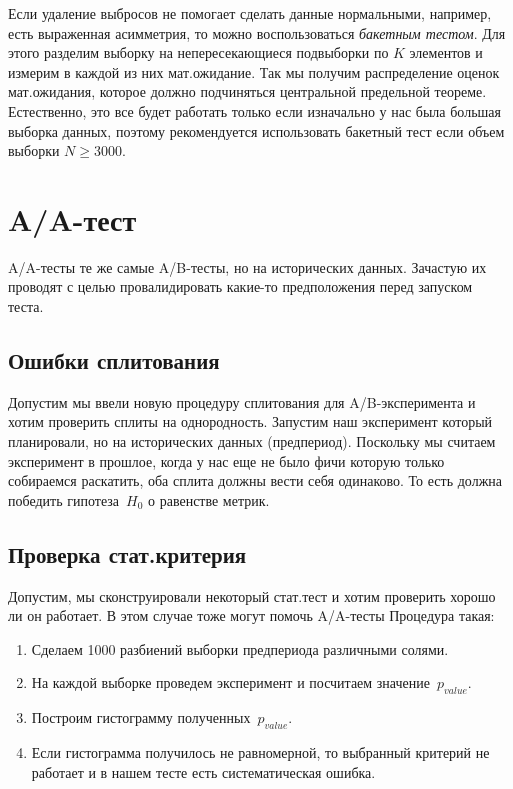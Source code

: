 \documentclass[../handbook.tex]{subfiles}
\begin{document}
Если удаление выбросов не помогает сделать данные нормальными, например, есть выраженная асимметрия, то можно воспользоваться \emph{бакетным тестом}. Для этого разделим выборку на непересекающиеся подвыборки по $K$ элементов и измерим в каждой из них мат.ожидание. Так мы получим распределение оценок мат.ожидания, которое должно подчиняться центральной предельной теореме. Естественно, это все будет работать только если изначально у нас была большая выборка данных, поэтому рекомендуется использовать бакетный тест если объем выборки $N \geq 3000$.


\section{A\slash A-тест}
A\slash A-тесты те же самые A\slash B-тесты, но на исторических данных. Зачастую их проводят с целью провалидировать какие-то предположения перед запуском теста.

\subsection{Ошибки сплитования}

Допустим мы ввели новую процедуру сплитования для A/B-эксперимента и хотим проверить сплиты на однородность. Запустим наш эксперимент который планировали, но на исторических данных (предпериод). Поскольку мы считаем эксперимент в прошлое, когда у нас еще не было фичи которую только собираемся раскатить, оба сплита должны вести себя одинаково. То есть должна победить гипотеза~$H_0$ о равенстве метрик.

\subsection{Проверка стат.критерия}
Допустим, мы сконструировали некоторый стат.тест и хотим проверить хорошо ли он работает. В этом случае тоже могут помочь A\slash A-тесты Процедура такая:

\begin{enumerate}
    \item Сделаем 1000 разбиений выборки предпериода различными солями.
    \item На каждой выборке проведем эксперимент и посчитаем значение~$p_{value}$.
    \item Построим гистограмму полученных~$p_{value}$.
    \item Если гистограмма получилось не равномерной, то выбранный критерий не работает и в нашем тесте есть систематическая ошибка. 
\end{enumerate}
\end{document}
